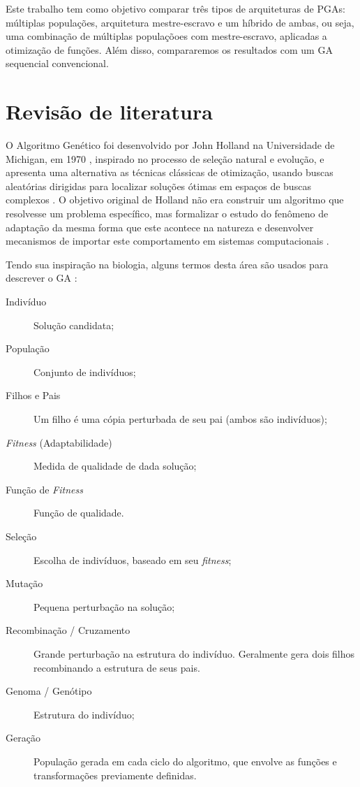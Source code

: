 \documentclass[12pt]{article}
\begin{document}
Este trabalho tem como objetivo comparar três tipos de arquiteturas de PGAs: múltiplas populações, arquitetura mestre-escravo e um híbrido de ambas, ou seja, uma combinação de múltiplas populaçõoes com mestre-escravo, aplicadas a otimização de funções. Além disso, compararemos os resultados com um GA sequencial convencional.

\section{Revisão de literatura} %
\label{sec:revisao_bibliogragica}


O Algoritmo Genético foi desenvolvido por John Holland na Universidade de Michigan, em 1970 \cite{holland1975}, inspirado no processo de seleção natural e evolução, e apresenta uma alternativa as técnicas clássicas de otimização, usando buscas aleatórias dirigidas para localizar soluções ótimas em espaços de buscas complexos \cite{gasurvey}. O objetivo original de Holland não era construir um algoritmo que resolvesse um problema específico, mas formalizar o estudo do fenômeno de adaptação da mesma forma que este acontece na natureza e desenvolver mecanismos de importar este comportamento em sistemas computacionais \cite{geintro1998}.

Tendo sua inspiração na biologia, alguns termos desta área são usados para descrever o GA \cite{luke2009}:
\begin{description}
	\item [Indivíduo] Solução candidata;
	\item [População] Conjunto de indivíduos;
	\item [Filhos e Pais] Um filho é uma cópia perturbada de seu pai (ambos são indivíduos);
	\item [\emph{Fitness} (Adaptabilidade)] Medida de qualidade de dada solução; 
	\item [Função de \emph{Fitness}] Função de qualidade. 
  \item [Seleção] Escolha de indivíduos, baseado em seu \emph{fitness};
  \item [Mutação] Pequena perturbação na solução;
  \item [Recombinação / Cruzamento] Grande perturbação na estrutura do indivíduo. Geralmente gera dois filhos recombinando a estrutura de seus pais.
  \item [Genoma / Genótipo] Estrutura do indivíduo;
  \item [Geração] População gerada em cada ciclo do algoritmo, que envolve as funções e transformações previamente definidas.
 \end{description}
\end{document}

